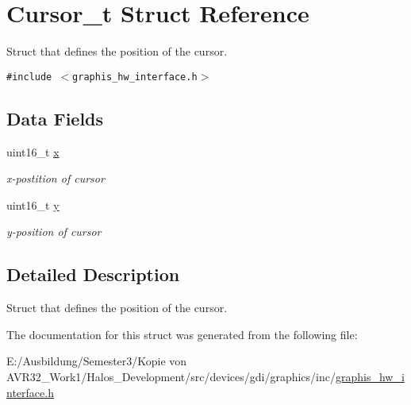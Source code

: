 \hypertarget{struct_cursor__t}{
\section{Cursor\_\-t Struct Reference}
\label{struct_cursor__t}
}
Struct that defines the position of the cursor.  


{\tt \#include $<$graphis\_\-hw\_\-interface.h$>$}

\subsection*{Data Fields}
\begin{CompactItemize}
\item 
\hypertarget{struct_cursor__t_41cf15528b7307c8d71a6a874fc29a1a}{
uint16\_\-t \hyperlink{struct_cursor__t_41cf15528b7307c8d71a6a874fc29a1a}{x}}
\label{struct_cursor__t_41cf15528b7307c8d71a6a874fc29a1a}

\begin{CompactList}\small\item\em x-postition of cursor \item\end{CompactList}\item 
\hypertarget{struct_cursor__t_1416c147ae9fce480335dbe6160398e7}{
uint16\_\-t \hyperlink{struct_cursor__t_1416c147ae9fce480335dbe6160398e7}{y}}
\label{struct_cursor__t_1416c147ae9fce480335dbe6160398e7}

\begin{CompactList}\small\item\em y-position of cursor \item\end{CompactList}\end{CompactItemize}


\subsection{Detailed Description}
Struct that defines the position of the cursor. 

The documentation for this struct was generated from the following file:\begin{CompactItemize}
\item 
E:/Ausbildung/Semester3/Kopie von AVR32\_\-Work1/Halos\_\-Development/src/devices/gdi/graphics/inc/\hyperlink{graphis__hw__interface_8h}{graphis\_\-hw\_\-interface.h}\end{CompactItemize}
